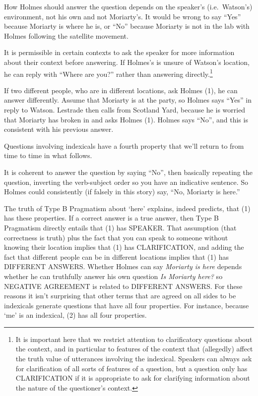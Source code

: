 \documentclass[
  11pt,
  letterpaper,
  DIV=11,
  numbers=noendperiod,
  twoside]{scrartcl}
\providecommand{\tightlist}{%
  \setlength{\itemsep}{0pt}\setlength{\parskip}{0pt}}
\begin{document}
\begin{description}
\tightlist
\item[SPEAKER]
How Holmes should answer the question depends on the speaker's
(i.e.~Watson's) environment, not his own and not Moriarty's. It would be
wrong to say ``Yes'' because Moriarty is where he is, or ``No'' because
Moriarty is not in the lab with Holmes following the satellite movement.
\item[CLARIFICATION]
It is permissible in certain contexts to ask the speaker for more
information about their context before answering. If Holmes's is unsure
of Watson's location, he can reply with ``Where are you?'' rather than
answering directly.\footnote{It is important here that we restrict
  attention to clarificatory questions about the context, and in
  particular to features of the context that (allegedly) affect the
  truth value of utterances involving the indexical. Speakers can always
  ask for clarification of all sorts of features of a question, but a
  question only has CLARIFICATION if it is appropriate to ask for
  clarifying information about the nature of the questioner's context.}
\item[DIFFERENT ANSWERS]
If two different people, who are in different locations, ask Holmes (1),
he can answer differently. Assume that Moriarty is at the party, so
Holmes says ``Yes'' in reply to Watson. Lestrade then calls from
Scotland Yard, because he is worried that Moriarty has broken in and
asks Holmes (1). Holmes says ``No'', and this is consistent with his
previous answer.
\end{description}

Questions involving indexicals have a fourth property that we'll return
to from time to time in what follows.

\begin{description}
\tightlist
\item[NEGATIVE AGREEMENT]
It is coherent to answer the question by saying ``No'', then basically
repeating the question, inverting the verb-subject order so you have an
indicative sentence. So Holmes could consistently (if falsely in this
story) say, ``No, Moriarty is here.''
\end{description}

The truth of Type B Pragmatism about `here' explains, indeed predicts,
that (1) has these properties. If a correct answer is a true answer,
then Type B Pragmatism directly entails that (1) has SPEAKER. That
assumption (that correctness is truth) plus the fact that you can speak
to someone without knowing their location implies that (1) has
CLARIFICATION, and adding the fact that different people can be in
different locations implies that (1) has DIFFERENT ANSWERS. Whether
Holmes can say \emph{Moriarty is here} depends whether he can truthfully
answer his own question \emph{Is Moriarty here?} so NEGATIVE AGREEMENT
is related to DIFFERENT ANSWERS. For these reasons it isn't surprising
that other terms that are agreed on all sides to be indexicals generate
questions that have all four properties. For instance, because `me' is
an indexical, (2) has all four properties.
\end{document}
